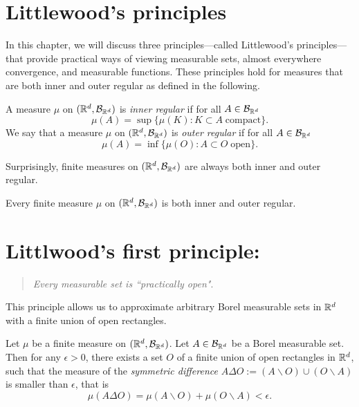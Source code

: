 
\section{Littlewood's principles}

In this chapter, we will discuss three principles---called Littlewood's principles---that provide practical ways of viewing measurable sets, almost everywhere convergence, and measurable functions. These principles hold for measures that are both inner and outer regular as defined in the following.

\begin{definition}
A measure $\mu$ on $(\mathbb R^d, \mathcal B_{\mathbb R^d})$ is \emph{inner regular} if for all $A \in \mathcal B_{\mathbb R^d}$ 
\[
	\mu(A) = \sup\bigl\{ \mu(K) : K\subset A\;\text{compact}\bigr\}.
\]
We say that a measure $\mu$ on $(\mathbb R^d, \mathcal B_{\mathbb R^d})$ is \emph{outer regular} if for all $A \in \mathcal B_{\mathbb R^d}$ 
\[
	\mu(A) = \inf \bigl\{ \mu(O): A\subset O\;\text{open}\bigr\}.
\]
\end{definition}

Surprisingly, finite measures on $(\mathbb R^d, \mathcal B_{\mathbb R^d})$ are always both inner and outer regular.

\begin{theorem}\label{th:regularity-measure}
	Every finite measure $\mu$ on $(\mathbb R^d, \mathcal B_{\mathbb R^d})$ is both inner and outer regular.	
\end{theorem}



\section{Littlwood's first principle:} 
\begin{quotation}
	\emph{Every measurable set is ``practically open"}.
\end{quotation}

This principle allows us to approximate arbitrary Borel measurable sets in $\mathbb R^d$ with a finite union of open rectangles.

\begin{theorem}\label{thm:littlewood-1}
Let $\mu$ be a finite measure on $(\mathbb R^d, \mathcal B_{\mathbb R^d})$.
Let $A \in \mathcal B_{\mathbb R^d}$ be a Borel measurable set. Then for any $\epsilon > 0$, there exists a set $O$ of a finite union of open rectangles in $\mathbb R^d$, such that the measure of the \emph{symmetric difference} $A \Delta O := (A \backslash O) \cup (O \backslash A)$ is smaller than $\epsilon$, that is
\[
\mu( A \Delta O  ) = \mu( A \backslash O ) + \mu( O \backslash A) < \epsilon.
\]
\end{theorem}

